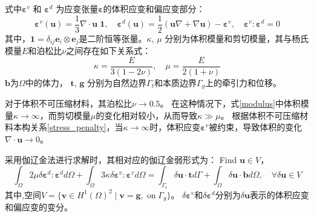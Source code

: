 式中$\boldsymbol \varepsilon^v$ 和 $\boldsymbol \varepsilon^d$ 为应变张量$\boldsymbol \varepsilon$的体积应变和偏应变部分：
\begin{equation}
    \boldsymbol \varepsilon^v(\boldsymbol u) =\frac{1}{3} \nabla \cdot \boldsymbol u \; \boldsymbol 1, \quad
    \boldsymbol \varepsilon^d(\boldsymbol u) =\frac{1}{2}(\boldsymbol u \nabla + \nabla \boldsymbol u) - \boldsymbol \varepsilon^v, \quad
    \boldsymbol \varepsilon^v : \boldsymbol \varepsilon^d = 0
\end{equation}
其中，$\boldsymbol 1 = \delta_{ij} \boldsymbol e_i \otimes \boldsymbol e_j$是二阶恒等张量。$\kappa$, $\mu$ 分别为体积模量和剪切模量，其与杨氏模量$E$和泊松比$\nu$之间存在如下关系式：
\begin{equation}\label{modulus}
    \kappa = \frac{E}{3(1-2\nu)}, \quad \mu = \frac{E}{2(1+\nu)}
\end{equation}
$\boldsymbol b$为$\Omega$中的体力， $\boldsymbol t$, $\boldsymbol g$ 分别为自然边界$\Gamma_t$和本质边界$\Gamma_g$上的牵引力和位移。


对于体积不可压缩材料，其泊松比$\nu \rightarrow 0.5$。 在这种情况下，式\eqref{modulus}中体积模量$\kappa \rightarrow \infty$，而剪切模量$\mu$的变化相对较小，从而导致$\kappa\gg\mu$。
根据体积不可压缩材料本构关系\eqref{stress_penalty}，当$\kappa \rightarrow \infty$时，体积应变$\boldsymbol \varepsilon^v$被约束，导致体积的变化$\nabla \cdot \boldsymbol u\rightarrow 0$。

采用伽辽金法进行求解时，其相对应的伽辽金弱形式为：
Find  $\boldsymbol u \in V$，
\begin{equation}\label{weak_penalty}
\int_\Omega 2\mu \delta \boldsymbol \varepsilon^d : \boldsymbol \varepsilon^d d\Omega +
\int_\Omega 3\kappa \delta \boldsymbol \varepsilon^v : \boldsymbol \varepsilon^v d\Omega =
\int_{\Gamma_t} \delta \boldsymbol u \cdot \boldsymbol t d\Gamma + \int_\Omega \delta \boldsymbol u \cdot \boldsymbol b d\Omega, \quad
\forall \delta \boldsymbol u \in V
\end{equation}
其中,空间$V=\{\boldsymbol v \in H^1(\Omega)^2\;\vert\;\boldsymbol v = \boldsymbol g, \; \textrm{on} \; \Gamma_g\}$。
$\delta\boldsymbol \varepsilon^v$和$\delta\boldsymbol \varepsilon^d $分别为$\delta \boldsymbol u$表示的体积应变和偏应变的变分。

